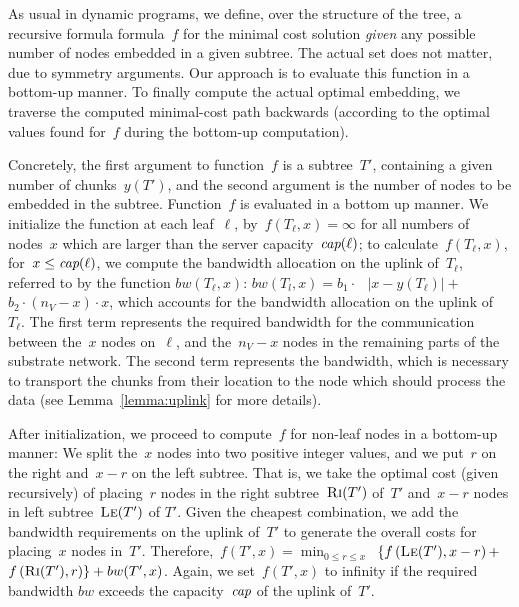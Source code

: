 \documentclass[preprint,12pt]{elsarticle}
\newcommand{\ChunkCount}{\ensuremath{y}}
\newcommand{\capacity}{\emph{cap}}
\newcommand{\Tree}{\ensuremath{T}}
\newcommand{\CostTrans}{\ensuremath{b_1}}
\newcommand{\CostCom}{\ensuremath{b_2}}
\newcommand{\Vms}{\ensuremath{n_V}}
\begin{document}
As usual in dynamic programs, we define, over the structure of the tree, a
recursive formula formula~$f$ for
the minimal cost solution \emph{given} any possible number of nodes
embedded in a given subtree. The actual set does not matter,
due to symmetry arguments.
Our approach is to evaluate this function in a bottom-up
manner.
To finally compute the actual optimal embedding,
we traverse the computed minimal-cost path backwards
(according to
the optimal values found for~$f$ during the bottom-up computation).

Concretely, the first argument to function~$f$
is a subtree~$\Tree'$, containing a given number of
chunks~$\ChunkCount(\Tree')$,
and the
second argument is the number of nodes to be embedded in the subtree.
Function~$f$ is evaluated in a bottom up manner. We initialize the
function at each leaf~$\ell$, by~$f(T_{\ell},x) =
\infty$ for all numbers of nodes~$x$ which are larger than
the server capacity~$\capacity(\ell)$;
to calculate~$f(T_{\ell}, x)$, for~$x \leq \capacity(\ell)$, we compute the
bandwidth allocation on the uplink of~$T_{\ell}$, referred to by the function
$bw(T_{\ell},x)$:
$bw(T_l,x)=  \CostTrans \cdot~$~$|x - \ChunkCount(T_{\ell})| +$~$ \CostCom \cdot
(\Vms - x) \cdot x$,
which accounts for the bandwidth allocation on the uplink of~$T_{\ell}$. The
first
term represents the required bandwidth for the communication between the~$x$
nodes on~$\ell$, and the~$\Vms - x$ nodes in the remaining parts of the substrate
network.
The second term represents
the bandwidth, which is necessary to transport the chunks from their location to
the node which should process the data (see Lemma~\ref{lemma:uplink} for more
details).

After initialization, we proceed to compute~$f$ for non-leaf
nodes in a bottom-up manner: We split the~$x$ nodes
into two positive integer
values, and we put~$r$ on the right and~$x - r$ on the left subtree.
That is, we take the optimal cost
(given recursively) of placing~$r$ nodes in
the right subtree~$\textsc{Ri}(T')$ of~$T'$ and~$x-r$ nodes in left subtree~$\textsc{Le}(T')$ of
$T'$. Given the cheapest combination, we add the bandwidth requirements
on the uplink of~$T'$ to generate the overall costs for placing~$x$ nodes in~$T'$.
Therefore,~$f(T',x) =   \min_{0\leq r \leq x}$~$ \{  f\left(\textsc{Le}(T'),
x-r\right) +$~$
f\left(\textsc{Ri}(T'), r\right) \} + bw(T',x)$.
Again, we set~$f(T',x)$ to infinity if the required bandwidth
$bw$ exceeds the capacity~$\capacity$ of the uplink of~$T'$.
\end{document}
